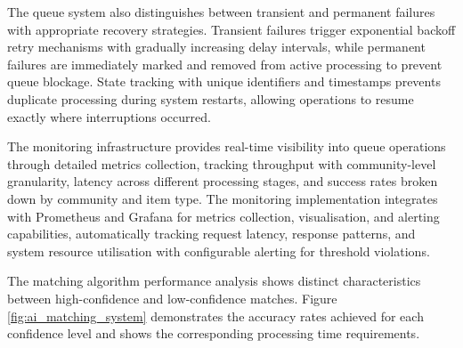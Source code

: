 The queue system also distinguishes between transient and permanent failures with appropriate recovery strategies. Transient failures trigger exponential backoff retry mechanisms with gradually increasing delay intervals, while permanent failures are immediately marked and removed from active processing to prevent queue blockage. State tracking with unique identifiers and timestamps prevents duplicate processing during system restarts, allowing operations to resume exactly where interruptions occurred.

The monitoring infrastructure provides real-time visibility into queue operations through detailed metrics collection, tracking throughput with community-level granularity, latency across different processing stages, and success rates broken down by community and item type. The monitoring implementation integrates with Prometheus and Grafana for metrics collection, visualisation, and alerting capabilities, automatically tracking request latency, response patterns, and system resource utilisation with configurable alerting for threshold violations.

The matching algorithm performance analysis shows distinct characteristics between high-confidence and low-confidence matches. Figure \ref{fig:ai_matching_system} demonstrates the accuracy rates achieved for each confidence level and shows the corresponding processing time requirements.

